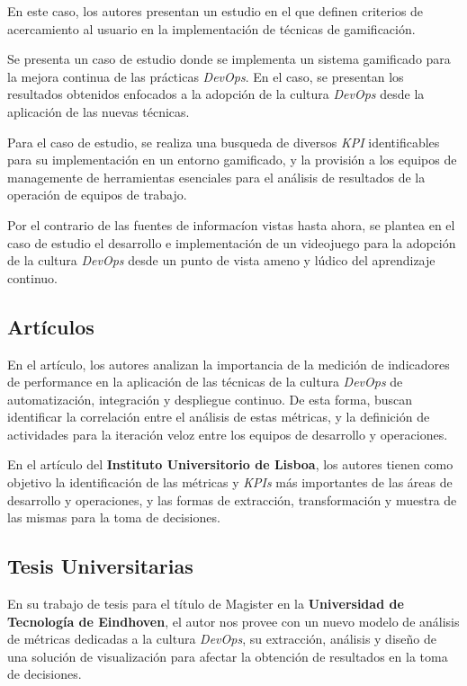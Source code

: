 \documentclass[journal]{IEEEtran}
\begin{document}
\cite{meng2014gamification} En este caso, los autores presentan un estudio en el que definen criterios de acercamiento al usuario en la implementación de técnicas de gamificación.

\cite{ayoup2022achievement} Se presenta un caso de estudio donde se implementa un sistema gamificado para la mejora continua de las prácticas \textit{DevOps}. En el caso, se presentan los resultados obtenidos enfocados a la adopción de la cultura \textit{DevOps} desde la aplicación de las nuevas técnicas.

\cite{palenvcarova2022goal} Para el caso de estudio, se realiza una busqueda de diversos \textit{KPI} identificables para su implementación en un entorno gamificado, y la provisión a los equipos de managemente de herramientas esenciales para el análisis de resultados de la operación de equipos de trabajo.

\cite{grande2023serious} Por el contrario de las fuentes de informacíon vistas hasta ahora, se plantea en el caso de estudio el desarrollo e implementación de un videojuego para la adopción de la cultura \textit{DevOps} desde un punto de vista ameno y lúdico del aprendizaje continuo.

\subsection{\textbf{\large Artículos}}

\cite{brunnert2015performance} En el artículo, los autores analizan la importancia de la medición de indicadores de performance en la aplicación de las técnicas de la cultura \textit{DevOps} de automatización, integración y despliegue continuo. De esta forma, buscan identificar la correlación entre el análisis de estas métricas, y la definición de actividades para la iteración veloz entre los equipos de desarrollo y operaciones.

\cite{amaro2024devops} En el artículo del \textbf{Instituto Universitorio de Lisboa}, los autores tienen como objetivo la identificación de las métricas y \textit{KPIs} más importantes de las áreas de desarrollo y operaciones, y las formas de extracción, transformación y muestra de las mismas para la toma de decisiones.

\subsection{\textbf{\large Tesis Universitarias}}

\cite{kruis2014designing} En su trabajo de tesis para el título de Magister en la \textbf{Universidad de Tecnología de Eindhoven}, el autor nos provee con un nuevo modelo de análisis de métricas dedicadas a la cultura \textit{DevOps}, su extracción, análisis y diseño de una solución de visualización para afectar la obtención de resultados en la toma de decisiones.
\end{document}
